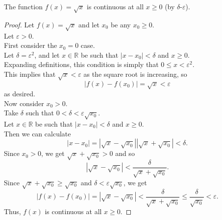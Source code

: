 \documentclass{article}
\newenvironment{theorem}[1]{\renewcommand\theinnercustomthm{#1}\innercustomthm}
  {\endinnercustomthm}
\begin{document}
\newpage{}
\begin{theorem}{2}
    The function $f(x)=\sqrt{x}$ is continuous at all $x\ge0$ (by $\delta$-$\varepsilon$).
\end{theorem}
\begin{proof}
    Let $f(x)=\sqrt{x}$ and let $x_0$ be any $x_0 \ge 0$. \\
    Let $\varepsilon > 0$. \\
    
    First consider the $x_0 = 0$ case. \\
    Let $\delta = \varepsilon^2$, and let $x \in \mathbb R$ be such that $|x-x_0|<\delta$ and $x \ge 0$. \\
    Expanding definitions, this condition is simply that $0\le x < \varepsilon^2$. \\
    This implies that $\sqrt{x} < \varepsilon$ as the square root is increasing, so
    \[
        |f(x)-f(x_0)| = \sqrt{x} < \varepsilon
    \]
    as desired. \\
    
    Now consider $x_0 > 0$. \\ 
    Take $\delta$ such that $0 < \delta < \varepsilon \sqrt{x_0}$. \\
    Let $x \in \mathbb R$ be such that $|x-x_0| < \delta$ and $x \ge 0$. \\
    Then we can calculate
    \[ |x-x_0| = \left|\sqrt{x} - \sqrt{x_0}\right|\left|\sqrt{x} + \sqrt{x_0}\right| < \delta.\]
    Since $x_0 > 0$, we get $\sqrt{x} + \sqrt{x_0} > 0$ and so \[\left|\sqrt{x} - \sqrt{x_0}\right|<\frac{\delta}{\sqrt{x} + \sqrt{x_0}}.\]
    Since $\sqrt{x} + \sqrt{x_0} \ge \sqrt{x_0}$ and $\delta < \varepsilon \sqrt{x_0}$, we get
    \[
        |f(x)-f(x_0)|=\left|\sqrt{x} - \sqrt{x_0}\right| <\frac{\delta}{\sqrt{x} + \sqrt{x_0}} \le \frac{\delta}{\sqrt{x_0}} < \varepsilon.
    \]
    Thus, $f(x)$ is continuous at all $x \ge 0$.
\end{proof}
\end{document}
